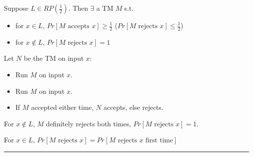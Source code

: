 \documentclass[twoside]{article}
\newenvironment{proof}{{\bf Proof:}}{\hfill\rule{2mm}{2mm}}
\begin{document}
\begin{proof}
    Suppose $L \in RP(\frac{1}{2})$. Then $\exists$ a \textsf{TM} $M$ s.t.

    \begin{itemize}
        \item for $x \in L$, $Pr[M \text{ accepts } x] \geq \frac{1}{2}$ ($Pr[M \text{ rejects } x] \leq \frac{1}{2}$)
        \item for $x \notin L$, $Pr[M \text{ rejects } x] = 1$
    \end{itemize}

    Let $N$ be the \textsf{TM} on input $x$:

    \begin{itemize}
        \item Run $M$ on input $x$.
        \item Run $M$ on input $x$.
        \item If $M$ accepted either time, $N$ accepts, else rejects.
    \end{itemize}

    For $x \notin L$, $M$ definitely rejects both times, $Pr[M \text{ rejects } x] = 1$.

    For $x \in L$, $Pr[M \text{ rejects } x] = Pr[M \text{ rejects } x \text{ first time}]$
\end{proof}
\end{document}
